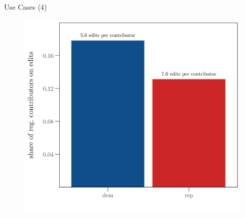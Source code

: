 \begin{frame}{Use Cases (4)}
\begin{figure}[t]
\begin{center}
\vspace{-.1cm}
	\includegraphics[scale=.63]{uc_4_usah_cont1.png}
	\vspace{-.5cm}
\end{center}
\end{figure}
\end{frame}

